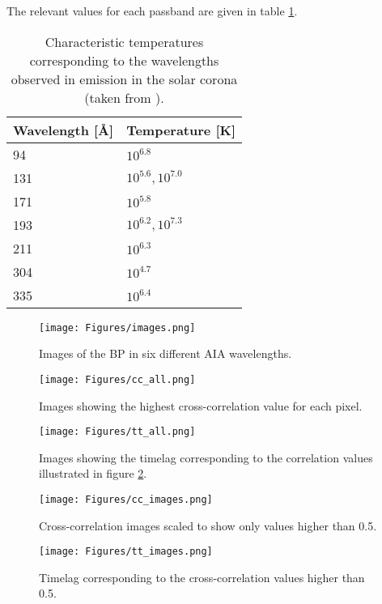 \documentclass[preprint2]{aastex}
\begin{document}
The relevant values for each passband are given in table \ref{temps}.
\begin{table}[h]
\centering
    \begin{tabular}{l l}
        \hline\hline
        Wavelength [\AA{}] & Temperature [K] \\
        \hline
        94 & $10^{6.8}$ \\
        131 & $10^{5.6}, 10^{7.0}$ \\
        171 & $10^{5.8}$ \\
        193 & $10^{6.2}, 10^{7.3}$ \\
        211 & $10^{6.3}$ \\
        304 & $10^{4.7}$ \\
        335 & $10^{6.4}$ \\
    \end{tabular}
\caption{Characteristic temperatures corresponding to the wavelengths observed
    in emission in the solar corona (taken from \cite{Lemen}).}
\label{temps}
\end{table}

\begin{figure*}[htb!]
    \texttt{[image: Figures/images.png]}
    \caption{Images of the BP in six different AIA wavelengths.}
    \label{full}
\end{figure*}

\begin{figure*}[htb!]
    \texttt{[image: Figures/cc\_all.png]}
    \caption{Images showing the highest cross-correlation value for each pixel. }
    \label{cc_all}
\end{figure*}

\begin{figure*}[htb!]
    \texttt{[image: Figures/tt\_all.png]}
    \caption{Images showing the timelag corresponding to the correlation values
        illustrated in figure \ref{cc_all}.}
    \label{tt_all}
\end{figure*}

\begin{figure*}[htb!]
    \texttt{[image: Figures/cc\_images.png]}
    \caption{Cross-correlation images scaled to show only values higher than 0.5.}
\end{figure*}

\begin{figure*}[htb!]
    \texttt{[image: Figures/tt\_images.png]}
    \caption{Timelag corresponding to the cross-correlation values higher than 0.5.}
\end{figure*}
\end{document}
